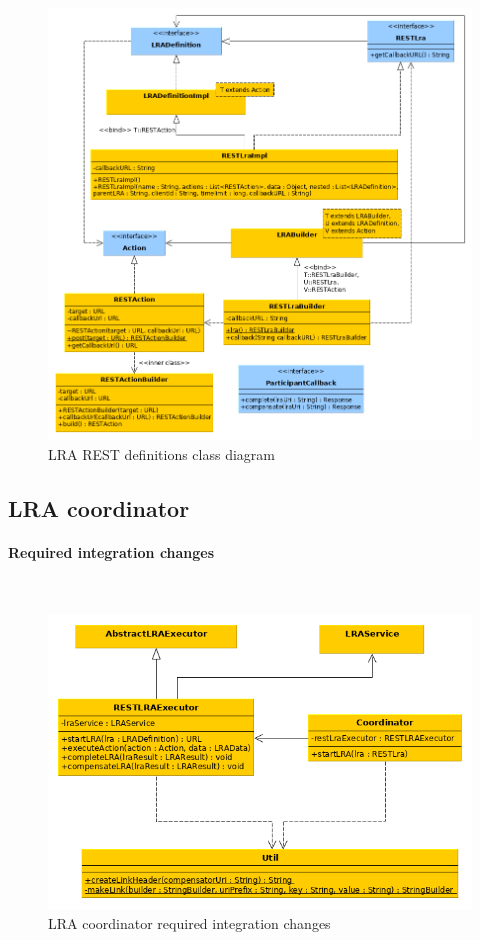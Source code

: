 \documentclass[oneside,
  digital, %
  table,   %
  lof,     %
  lot,     %
]{fithesis3}
\newcommand{\newlinepar}[1]{\paragraph{#1}\needspace{4\baselineskip}\mbox{}\\}
\begin{document}
\begin{figure}[!h]
    \begin{center}
        \includegraphics[trim=3cm 0 0 0,height=0.8\textheight]{images/classDiagrams/lra-rest-definitions.png}
    \end{center}
    \caption{LRA REST definitions class diagram}
    \label{fig:lra-rest-definitions-class-diagram}
\end{figure}

\clearpage

\subsection{LRA coordinator}

\newlinepar{Required integration changes}

\hfill \break


\begin{figure}[!h]
    \begin{center}
        \includegraphics[trim=3cm 0 0 0,height=0.55\textheight]{images/classDiagrams/lra-coordinator.png}
    \end{center}
    \caption{LRA coordinator required integration changes}
    \label{fig:lra-coordinator-integration-class-diagram}
\end{figure}
\end{document}
